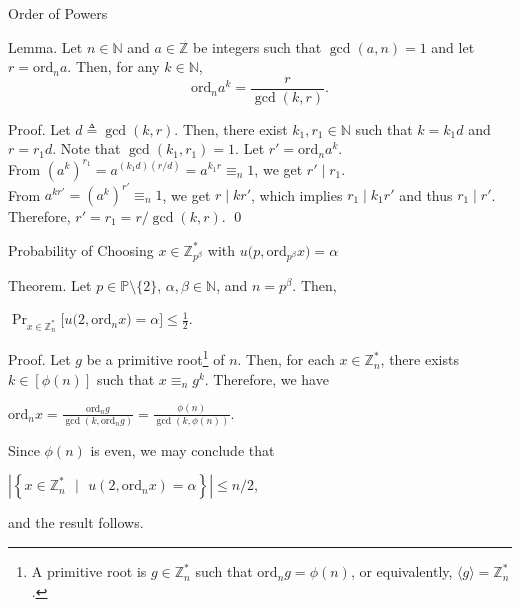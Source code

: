 \documentclass{beamer}
\newcommand{\mbb}[1]{\mathbb{#1}}
\newcommand{\mrm}[1]{\mathrm{#1}}
\renewcommand{\:}{\text{ }}
\newcommand{\ord}[1]{\mrm{ord}_{#1}}
\begin{document}
    \begin{frame}{Order of Powers}
        \begin{exampleblock}{Lemma.}
            Let $n \in \mbb{N}$ and $a \in \mbb{Z}$ be integers such that $\gcd(a, n) = 1$ and let $r = \ord{n}a$.
            Then, for any $k \in \mbb{N}$, \[ \ord{n} a^k = \frac{r}{\gcd(k, r)}\text{.} \]
        \end{exampleblock}
        \begin{exampleblock}{Proof.}
            \small
            Let $d \triangleq \gcd(k, r)$. Then, there exist $k_1, r_1 \in \mbb{N}$ such that $k = k_1d$ and $r=r_1d$. Note that $\gcd(k_1, r_1) = 1$.
            Let $r' = \ord{n}a^k$.\\[.2em]
            From $(a^k)^{r_1} = a^{(k_1d)(r/d)} = a^{k_1r} \equiv_n 1$, we get $r' \mid r_1$.\\[.2em]
            From $a^{kr'} = (a^k)^{r'} \equiv_n 1$, we get $r \mid kr'$, which implies $r_1 \mid k_1r'$ and thus $r_1 \mid r'$.\\[.2em]
            Therefore, $r' = r_1 = r/\gcd(k, r)$. \qed
        \end{exampleblock}
    \end{frame}

    \hypertarget{probX}{
    \begin{frame}{Probability of Choosing $x \in \mbb{Z}_{p^\beta}^\ast$ with $u\big(p, \ord{p^\beta} x\big) = \alpha$}
        \begin{exampleblock}{Theorem.}
            Let $p \in \mbb{P} \setminus \{2\}$, $\alpha, \beta \in \mbb{N}$, and $n = p^\beta$. Then,\\[.3em]
            \centerline{$\displaystyle \Pr_{x \in \mbb{Z}_n^\ast} \Big[ u\big(2, \ord{n} x \big) = \alpha \Big] \leq \frac{1}{2}\text{.}$}
        \end{exampleblock}
        \begin{exampleblock}{Proof.}
            \small
            Let $g$ be a primitive root\footnote{A primitive root is $g \in \mbb{Z}_n^\ast$ such that $\ord{n}g = \phi(n)$, or equivalently, $\langle g \rangle = \mbb{Z}_n^\ast$.} of $n$.
            Then, for each $x \in \mbb{Z}_n^\ast$, there exists $k \in [\phi(n)]$ such that $x \equiv_n g^k$. Therefore, we have\\[.3em]
            \centerline{$\displaystyle \ord{n} x = \frac{\ord{n}g}{\gcd(k, \ord{n}g)} = \frac{\phi(n)}{\gcd(k, \phi(n))}\text{.}$}\vspace*{.3em}
            Since $\phi(n)$ is even, we may conclude that\\[.3em]
            \centerline{$\left| \left\{ x \in \mbb{Z}_n^\ast \:\big|\: u\left( 2, \ord{n}x \right) = \alpha \right\} \right| \leq n/2$,}\vspace*{.3em}
            and the result follows.
        \end{exampleblock}
    \end{frame}}
\end{document}
